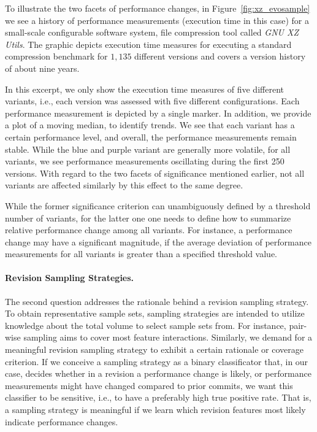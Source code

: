 To illustrate the two facets of performance changes, in
Figure~\ref{fig:xz_evosample} we see a history of performance measurements (execution time in this case) for a
small-scale configurable software system, file compression tool called \emph{GNU
XZ Utils}. The graphic depicts execution time measures for executing a standard
compression benchmark for $1,135$ different versions and covers a version
history of about nine years. 

In this excerpt, we only show the execution time measures of five different
variants, i.e., each version was assessed with five different configurations.
Each performance measurement is depicted by a single marker. In addition, we
provide a plot of a moving median, to identify trends. We see that each variant
has a certain performance level, and overall, the performance measurements
remain stable. While the blue and purple variant are generally more volatile,
for all variants, we see performance measurements oscillating during the first
250 versions. With regard to the two facets of significance mentioned earlier,
not all variants are affected similarly by this effect to the same degree.

While the former significance criterion can unambiguously defined by a threshold
number of variants, for the latter one one needs to define how to summarize
relative performance change among all variants. For instance, a performance
change may have a significant magnitude, if the average deviation of
performance measurements for all variants is greater than a specified threshold
value.

\paragraph{Revision Sampling Strategies.} The second question addresses the
rationale behind a revision sampling strategy. To obtain representative sample sets, sampling
strategies are intended to utilize knowledge about the total volume to select
sample sets from. For instance, pair-wise sampling aims to cover most feature
interactions. Similarly, we demand for a meaningful revision sampling strategy
to exhibit a certain rationale or coverage criterion. If we conceive a sampling
strategy as a binary classificator that, in our case, decides whether in a
revision a performance change is likely, or performance measurements might have
changed compared to prior commits, we want  this classifier to be sensitive,
i.e., to have a preferably high true positive rate. That is, a sampling
strategy is meaningful if we learn which revision features most likely indicate
performance changes.\\

